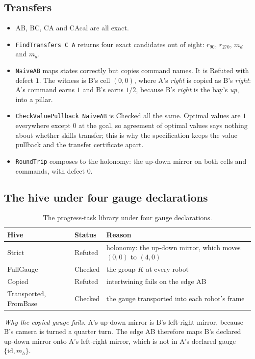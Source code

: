 \documentclass[11pt]{article}
\newcommand{\code}[1]{\texttt{#1}}
\theoremstyle{definition}
\theoremstyle{plain}
\begin{document}
\subsection{Transfers}

\begin{itemize}
\item AB, BC, CA and CAcal are all exact.
\item \code{FindTransfers C A} returns four exact candidates out of eight: $r_{90}$, $r_{270}$, $m_d$
and $m_a$.
\item \code{NaiveAB} maps states correctly but copies command names. It is Refuted with defect $1$.
The witness is B's cell $(0,0)$, where A's \emph{right} is copied as B's \emph{right}: A's command
earns $1$ and B's earns $1/2$, because B's \emph{right} is the bay's \emph{up}, into a pillar.
\item \code{CheckValuePullback NaiveAB} is Checked all the same. Optimal values are $1$ everywhere
except $0$ at the goal, so agreement of optimal values says nothing about whether skills transfer;
this is why the specification keeps the value pullback and the transfer certificate apart.
\item \code{RoundTrip} composes to the holonomy: the up-down mirror on both cells and commands, with
defect $0$.
\end{itemize}

\subsection{The hive under four gauge declarations}

\begin{table}[ht]
\centering\small
\begin{tabularx}{\textwidth}{llX}
\toprule
Hive & Status & Reason\\
\midrule
Strict & Refuted & holonomy: the up-down mirror, which moves $(0,0)$ to $(4,0)$\\
FullGauge & Checked & the group $K$ at every robot\\
Copied & Refuted & intertwining fails on the edge AB\\
Transported, FromBase & Checked & the gauge transported into each robot's frame\\
\bottomrule
\end{tabularx}
\caption{The progress-task library under four gauge declarations.}\label{tab:ex3hives}
\end{table}

\emph{Why the copied gauge fails.} A's up-down mirror is B's left-right mirror, because B's camera is
turned a quarter turn. The edge AB therefore maps B's declared up-down mirror onto A's left-right
mirror, which is not in A's declared gauge $\{\mathrm{id},m_h\}$.
\end{document}
